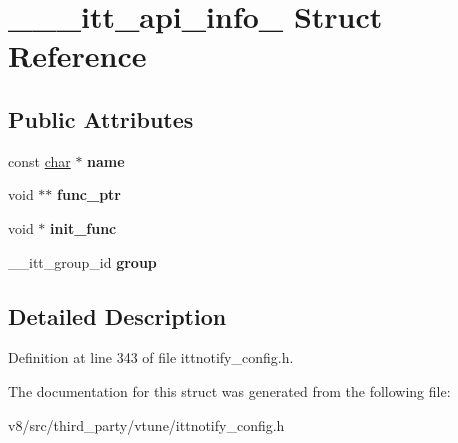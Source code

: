 \hypertarget{struct______itt__api__info__20101001}{}\section{\+\_\+\+\_\+\+\_\+itt\+\_\+api\+\_\+info\+\_ Struct Reference}
\label{struct______itt__api__info__20101001}
\subsection*{Public Attributes}
\begin{DoxyCompactItemize}
\item 
\mbox{\label{struct______itt__api__info__20101001_a8e9d10c3041b72e1ea0355b40ee772a5}} 
const \mbox{\hyperlink{classchar}{char}} $\ast$ {\bfseries name}
\item 
\mbox{\label{struct______itt__api__info__20101001_a3055f1f3a553efe6059d674987e0b2e8}} 
void $\ast$$\ast$ {\bfseries func\+\_\+ptr}
\item 
\mbox{\label{struct______itt__api__info__20101001_a2c2825ddd464d578ab867e86f83da253}} 
void $\ast$ {\bfseries init\+\_\+func}
\item 
\mbox{\label{struct______itt__api__info__20101001_abd973a098fd9181d23e93fcb2a3de469}} 
\+\_\+\+\_\+itt\+\_\+group\+\_\+id {\bfseries group}
\end{DoxyCompactItemize}


\subsection{Detailed Description}


Definition at line 343 of file ittnotify\+\_\+config.\+h.



The documentation for this struct was generated from the following file\+:\begin{DoxyCompactItemize}
\item 
v8/src/third\+\_\+party/vtune/ittnotify\+\_\+config.\+h\end{DoxyCompactItemize}

